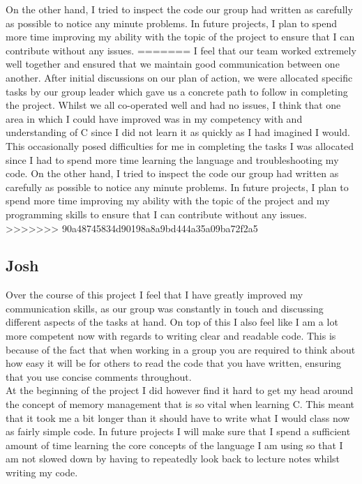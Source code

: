 \documentclass[11pt]{article}
\begin{document}
On the other hand, I tried to inspect the code our group had written as carefully as possible to notice any minute problems. In future projects, I plan to spend more time improving my ability with the topic of the project to ensure that I can contribute without any issues.  
=======
I feel that our team worked extremely well together and ensured that we maintain good communication between one another. After initial discussions on our plan of action, we were allocated specific tasks by our group leader which gave us a concrete path to follow in completing the project. Whilst we all co-operated well and had no issues, I think that one area in which I could have improved was in my competency with and understanding of C since I did not learn it as quickly as I had imagined I would. This occasionally posed difficulties for me in completing the tasks I was allocated since I had to spend more time learning the language and troubleshooting my code. On the other hand, I tried to inspect the code our group had written as carefully as possible to notice any minute problems. In future projects, I plan to spend more time improving my ability with the topic of the project and my programming skills to ensure that I can contribute without any issues.  
>>>>>>> 90a48745834d90198a8a9bd444a35a09ba72f2a5


\subsection{Josh}
Over the course of this project I feel that I have greatly improved my communication skills, as our group was constantly in touch and discussing different aspects of the tasks at hand. On top of this I also feel like I am a lot more competent now with regards to writing clear and readable code. This is because of the fact that when working in a group you are required to think about how easy it will be for others to read the code that you have written, ensuring that you use concise comments throughout. \\

At the beginning of the project I did however find it hard to get my head around the concept of memory management that is so vital when learning C. This meant that it took me a bit longer than it should have to write what I would class now as fairly simple code. In future projects I will make sure that I spend a sufficient amount of time learning the core concepts of the language I am using so that I am not slowed down by having to repeatedly look back to lecture notes whilst writing my code.
\end{document}
